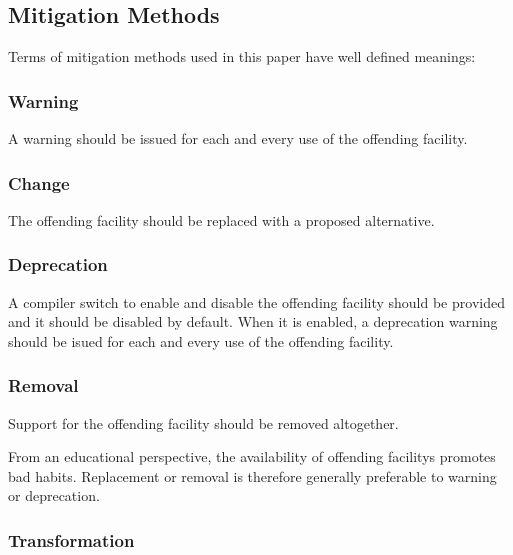\documentclass[10pt,a4paper]{article}
\begin{document}
\subsection{Mitigation Methods}

Terms of mitigation methods used in this paper have well defined meanings:

\subsubsection{Warning}

A warning should be issued for each and every use of the
\gls{offending facility}.

\subsubsection{Change}

The \gls{offending facility} should be replaced with a proposed alternative.

\subsubsection{Deprecation}

A compiler switch to enable and disable the \gls{offending facility} should
be provided and it should be disabled by default. When it is enabled, a
deprecation warning should be isued for each and every use of the
\gls{offending facility}.

\subsubsection{Removal}

Support for the \gls{offending facility} should be removed altogether.\\

\par\noindent From an educational perspective, the availability of
\glspl{offending facility} promotes bad habits. Replacement or removal
is therefore generally preferable to warning or deprecation.

\subsubsection{Transformation}
\end{document}
